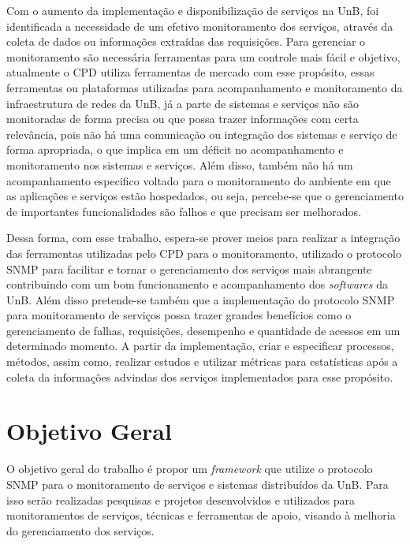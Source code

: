 Com o aumento da implementação e disponibilização de serviços na UnB, foi identificada a necessidade de um efetivo monitoramento dos serviços, através da coleta de dados ou informações extraídas das requisições. Para gerenciar o monitoramento são necessária ferramentas para um controle mais fácil e objetivo, atualmente o CPD utiliza ferramentas de mercado com esse propósito, essas ferramentas ou  plataformas utilizadas para acompanhamento e monitoramento da infraestrutura de redes da UnB, já a parte de sistemas e serviços não são monitoradas de forma precisa ou que possa trazer informações com certa relevância, pois não há uma comunicação ou integração dos sistemas e serviço de forma apropriada, o que implica em um déficit no acompanhamento e monitoramento nos sistemas e serviços. Além disso, também não há um acompanhamento especifico voltado para o monitoramento do ambiente em que as aplicações e serviços estão hospedados, ou seja, percebe-se que o gerenciamento de importantes funcionalidades são falhos e que precisam ser melhorados.

Dessa forma, com esse trabalho, espera-se prover meios para realizar a integração das ferramentas utilizadas pelo CPD para o monitoramento, utilizado o protocolo SNMP para facilitar e tornar o gerenciamento dos serviços mais abrangente contribuindo com um bom funcionamento e acompanhamento dos \textit{softwares} da UnB. Além disso pretende-se também que a implementação do protocolo SNMP para monitoramento de serviços possa trazer grandes benefícios como o gerenciamento de falhas, requisições, desempenho e quantidade de acessos em um determinado momento. A partir da implementação, criar e especificar processos, métodos, assim como, realizar estudos e utilizar métricas para estatísticas após a coleta da informações advindas dos serviços implementados para esse propósito. 


\section{Objetivo Geral}

O objetivo geral do trabalho é propor um \textit{framework} que utilize o protocolo SNMP para o monitoramento de serviços e sistemas distribuídos da UnB. Para isso serão realizadas  pesquisas e projetos desenvolvidos e utilizados para monitoramentos de serviços, técnicas e ferramentas de apoio, visando à melhoria do gerenciamento dos serviços.

